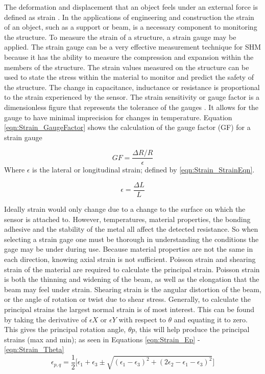 \indent The deformation and displacement that an object feels under an external force is defined as strain \cite{OmegaEngineeering:2013}. In the applications of engineering and construction the strain of an object, such as a support or beam, is a necessary component to monitoring the structure. To measure the strain of a structure, a strain gauge may be applied. The strain gauge can be a very effective measurement technique for SHM because it has the ability to measure the compression and expansion within the members of the structure. The strain values measured on the structure can be used to state the stress within the material to monitor and predict the safety of the structure. The change in capacitance, inductance or resistance is proportional to the strain experienced by the sensor. The strain sensitivity or gauge factor is a dimensionless figure that represents the tolerance of the gauges . It allows for the gauge to have minimal imprecision for changes in temperature. Equation \ref{eqn:Strain_GaugeFactor} shows the calculation of the gauge factor (GF) for a strain gauge

\begin{equation}
GF = \frac{\Delta R / R}{\epsilon} 
\label{eqn:Strain_GaugeFactor}
\end{equation}
\indent Where $\epsilon$ is the lateral or longitudinal strain; defined by \ref{eqn:Strain_StrainEqn}.

\begin{equation}
\epsilon = \frac{\Delta L}{L}
\label{eqn:Strain_StrainEqn}
\end{equation} 

\indent Ideally strain would only change due to a change to the surface on which the sensor is attached to. However, temperatures, material properties, the bonding adhesive and the stability of the metal all affect the detected resistance. So when selecting a strain gage one must be thorough in understanding the conditions the gage may be under during use. Because material properties are not the same in each direction, knowing axial strain is not sufficient. Poisson strain and shearing strain of the material are required to calculate the principal strain. Poisson strain is both the thinning and widening of the beam, as well as the elongation that the beam may feel under strain. Shearing strain is the angular distortion of the beam, or the angle of rotation or twist due to shear stress. Generally, to calculate the principal strains the largest normal strain is of most interest. This can be found by taking the derivative of $\epsilon X$ or $\epsilon Y$ with respect to $\theta$ and equating it to zero. This gives the principal rotation angle, $\theta p$, this will help produce the principal strains (max and min); as seen in Equations \ref{eqn:Strain_Ep} - \ref{eqn:Strain_Theta}
\begin{equation}
\epsilon_{p,q} = \frac{1}{2}\biggl[\epsilon_{1} + \epsilon_{3} \pm \sqrt{(\epsilon_{1}-\epsilon_{3})^{2}+(2\epsilon_{2}-\epsilon_{1}-\epsilon_{3})^{2}}\biggr]
\label{eqn:Strain_Ep}
\end{equation}

